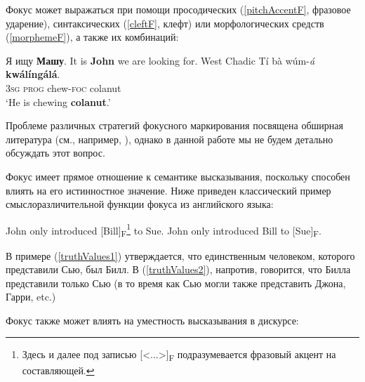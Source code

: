 \documentclass[a4paper, titlepage, 12pt]{article}
\begin{document}
\medskip

Фокус может выражаться при помощи просодических (\ref{pitchAccentF}, фразовое ударение), синтаксических (\ref{cleftF}, клефт) или морфологических средств (\ref{morphemeF}), а также их комбинаций:

\begin{exe}
    \ex
    \begin{xlist}
        \ex \label{pitchAccentF} Я ищу \textbf{Машу}.
        \ex \label{cleftF} It is \textbf{John} we are looking for.
        \ex \label{morphemeF}
            {\footnotesize West Chadic}
            \gll Tí bà wúm-\textit{á} \textbf{kwálíngálá}. \\
                 \textsc{3sg} \textsc{prog} chew-\textsc{foc} colanut \\
            \glt `He is chewing \textbf{colanut}.' \citep[ex.\ 3b]{hartmann}
    \end{xlist}
\end{exe}

Проблеме различных стратегий фокусного маркирования посвящена обширная литература (см., например, \citep{selkirk1984phonology,selkirk199516,Schwarzschild1999}), однако в данной работе мы не будем детально обсуждать этот вопрос.

\medskip

Фокус имеет прямое отношение к семантике высказывания, поскольку способен влиять на его истинностное значение. Ниже приведен классический пример смыслоразличительной функции фокуса из английского языка:

\newpage

\begin{exe}
    \ex \begin{xlist} \label{truthValues}
        \ex \label{truthValues1} John only introduced [Bill]\textsubscript{F}\footnote{Здесь и далее под записью [<...>]\textsubscript{F} подразумевается фразовый акцент на составляющей.} to Sue.
        \ex \label{truthValues2} John only introduced Bill to [Sue]\textsubscript{F}.
    \end{xlist}
\end{exe}

В примере (\ref{truthValues1}) утверждается, что единственным человеком, которого представили Сью, был Билл. В (\ref{truthValues2}), напротив, говорится, что Билла представили только Сью (в то время как Сью могли также представить Джона, Гарри, etc.)

\medskip

Фокус также может влиять на уместность высказывания в дискурсе:
\end{document}
